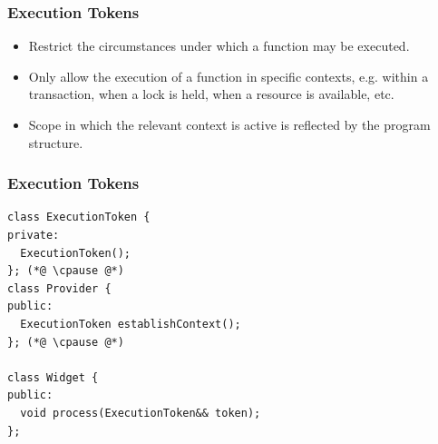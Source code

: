 \documentclass[aspectratio=169]{beamer}
\newif\iftransitions
\newcommand{\cpause}{\iftransitions \pause \fi}
\begin{document}
\begin{frame}[fragile]
  \frametitle{Execution Tokens}
  
  \begin{itemize}
  \item Restrict the circumstances under which a function may be executed.
  \item Only allow the execution of a function in specific contexts, e.g. within a transaction, when a lock is held, when a resource is available, etc.
  \item Scope in which the relevant context is active is reflected by the program structure.
  \end{itemize}
\end{frame}

\begin{frame}[fragile]
  \frametitle{Execution Tokens}
  
  \begin{lstlisting}[style=cpp20]
class ExecutionToken {
private:
  ExecutionToken();
}; (*@ \cpause @*)
class Provider {
public:
  ExecutionToken establishContext();
}; (*@ \cpause @*)

class Widget {
public:
  void process(ExecutionToken&& token);
};
  \end{lstlisting}
  
\end{frame}

\end{document}
